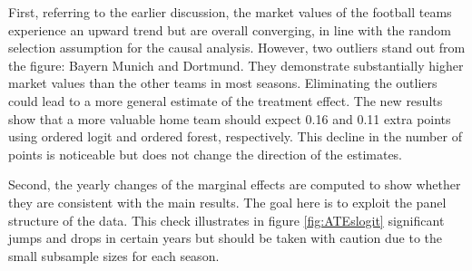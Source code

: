 \documentclass[11pt]{article}
\begin{document}
First, referring to the earlier discussion, the market values of the football teams experience an upward trend but are overall converging, in line with the random selection assumption for the causal analysis. However, two outliers stand out from the figure: Bayern Munich and Dortmund. They demonstrate substantially higher market values than the other teams in most seasons. Eliminating the outliers could lead to a more general estimate of the treatment effect. The new results show that a more valuable home team should expect 0.16 and 0.11 extra points using ordered logit and ordered forest, respectively. This decline in the number of points is noticeable but does not change the direction of the estimates. %


Second, the yearly changes of the marginal effects are computed to show whether they are consistent with the main results. The goal here is to exploit the panel structure of the data. This check illustrates in figure \ref{fig:ATEslogit} significant jumps and drops in certain years but should be taken with caution due to the small subsample sizes for each season.
\end{document}
